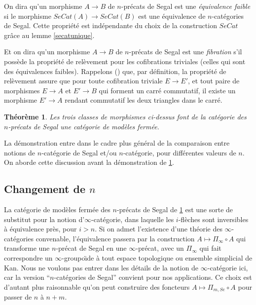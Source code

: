 \documentclass[12pt]{article}
\newcommand{\subnumero}[1]{\subsection*{#1}\phantomsection\addcontentsline{toc}{subsection}{#1}}
\newtheorem{theoreme}[lemma]{Th\'eor\`eme}
\begin{document}
On dira qu'un morphisme $A\rightarrow B$ de $n$-pr\'ecats de Segal est
une {\em
\'equivalence faible} si le morphisme
$SeCat(A)\rightarrow SeCat(B)$ est une \'equivalence
de $n$-cat\'egories de Segal. Cette propri\'et\'e est ind\'ependante du choix de
la construction $SeCat$ gr\^ace au lemme \ref{secatunique}.

Et on dira qu'un morphisme $A\rightarrow B$ de $n$-pr\'ecats de Segal
est une {\em
fibration} s'il poss\`ede la propri\'et\'e de rel\`evement pour les
cofibrations
triviales (celles qui sont des \'equivalences faibles).
Rappelons (\cite{Quillen}) que, par d\'efinition,
la propri\'et\'e de rel\`evement assure que
pour toute cofibration triviale $E\rightarrow E'$, et tout paire de morphismes
$E\rightarrow A$ et $E'\rightarrow B$ qui forment un carr\'e commutatif, il
existe un morphisme $E'\rightarrow A$ rendant commutatif les deux triangles
dans le carr\'e.

\begin{theoreme}
\label{SeCmf}
Les trois classes de morphismes
ci-dessus
font de la cat\'egorie des $n$-pr\'ecats de Segal
une cat\'egorie de mod\`eles ferm\'ee.
\end{theoreme}

La d\'emonstration entre dans le cadre plus g\'en\'eral de la comparaison
entre notions de $n$-cat\'egorie de Segal et/ou $n$-cat\'egorie, pour
diff\'erentes valeurs de $n$. On aborde cette discussion avant
la d\'emonstration de \ref{SeCmf}.

\subnumero{Changement de \texorpdfstring{$n$}{n}}

La cat\'egorie de mod\`eles ferm\'ee des $n$-pr\'ecats de Segal de
\ref{SeCmf} est une sorte de substitut pour la notion d'$\infty$-cat\'egorie,
dans laquelle les $i$-fl\`eches sont inversibles \`a \'equivalence pr\`es, pour
$i>n$. Si on admet l'existence d'une th\'eorie des $\infty$-cat\'egories
convenable, l'\'equivalence
passera par la construction $A\mapsto \Pi _{\infty} \circ A$ qui transforme une
$n$-pr\'ecat de Segal en une $\infty$-pr\'ecat, avec un $\Pi _{\infty}$ qui fait
correspondre un
$\infty$-groupo\"{\i}de \`a tout espace topologique ou ensemble simplicial
de Kan.
Nous ne voulons pas entrer dans les d\'etails de la notion de
$\infty$-cat\'egorie
ici, car la version ``$n$-cat\'egories de Segal'' convient pour nos
applications.
Ce choix est d'autant plus raisonnable qu'on peut construire des
foncteurs $A\mapsto \Pi
_{m,Se}\circ A$ pour passer de $n$ \`a $n+m$.
\end{document}
